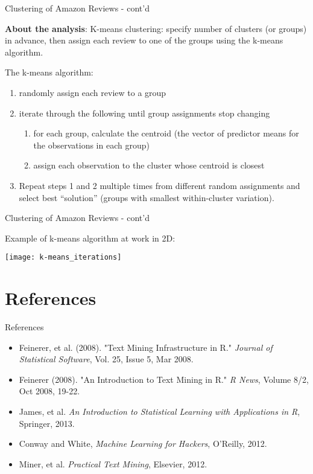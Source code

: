 \documentclass[xcolor=dvipsnames]{beamer}
\newcommand{\be}{\begin{enumerate}}
\newcommand{\ee}{\end{enumerate}}
\newcommand{\bi}{\begin{itemize}}
\newcommand{\ei}{\end{itemize}}
\newcommand{\+}{\item}
\begin{document}
\begin{frame}{Clustering of Amazon Reviews - cont'd}

{\bf About the analysis}: K-means clustering: specify number of clusters (or groups) in advance, then assign each review to one of the groups using the k-means algorithm.

The k-means algorithm:
\be
	\+ randomly assign each review to a group
	\+ iterate through the following until group assignments stop changing
	\be
		\+for each group, calculate the centroid (the vector of predictor means for the observations in each group)
		\+assign each observation to the cluster whose centroid is closest
	\ee
	\+ Repeat steps 1 and 2 multiple times from different random assignments and select best ``solution'' (groups with smallest within-cluster variation).
\ee

\end{frame}


\begin{frame}{Clustering of Amazon Reviews - cont'd}

Example of k-means algorithm at work in 2D:

\texttt{[image: k-means\_iterations]}

\end{frame}


\section{References}
\begin{frame}{References}

\bi
	\+ Feinerer, et al. (2008). "Text Mining Infrastructure in R." {\it Journal of Statistical Software}, Vol. 25, Issue 5, Mar 2008.
	\+ Feinerer (2008). "An Introduction to Text Mining in R." {\it R News}, Volume 8/2, Oct 2008, 19-22.
	\+ James, et al. {\it An Introduction to Statistical Learning with Applications in R}, Springer, 2013.
	\+ Conway and White, {\it Machine Learning for Hackers}, O'Reilly, 2012.
	\+ Miner, et al.  {\it Practical Text Mining}, Elsevier, 2012.
\ei

\end{frame}
\end{document}
